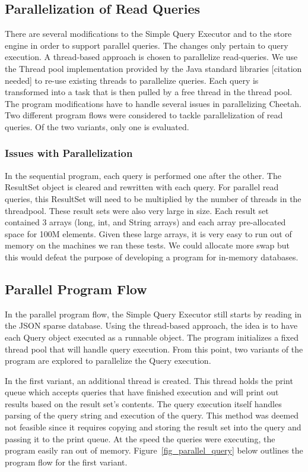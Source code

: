 \documentclass[11pt,journal,compsoc]{IEEEtran}
\begin{document}
\subsection{Parallelization of Read Queries}
There are several modifications to the Simple Query Executor and to the store engine in order to support parallel queries. The changes only pertain to query execution. A thread-based approach is chosen to parallelize read-queries. We use the Thread pool implementation provided by the Java standard libraries [citation needed] to re-use existing threads to parallelize queries. Each query is transformed into a task that is then pulled by a free thread in the thread pool. The program modifications have to handle several issues in parallelizing Cheetah. Two different program flows were considered to tackle parallelization of read queries. Of the two variants, only one is evaluated.

\subsubsection{Issues with Parallelization}
In the sequential program, each query is performed one after the other. The ResultSet object is cleared and rewritten with each query. For parallel read queries, this ResultSet will need to be multiplied by the number of threads in the threadpool. These result sets were also very large in size. Each result set contained 3 arrays (long, int, and String arrays) and each array pre-allocated space for 100M elements. Given these large arrays, it is very easy to run out of memory on the machines we ran these tests. We could allocate more swap but this would defeat the purpose of developing a program for in-memory databases.

\subsection{Parallel Program Flow}
In the parallel program flow, the Simple Query Executor still starts by reading in the JSON sparse database. Using the thread-based approach, the idea is to have each Query object executed as a runnable object. The program initializes a fixed thread pool that will handle query execution. From this point, two variants of the program are explored to parallelize the Query execution.


In the first variant, an additional thread is created. This thread holds the print queue which accepts queries that have finished execution and will print out results based on the result set’s contents. The query execution itself handles parsing of the query string and execution of the query. This method was deemed not feasible since it requires copying and storing the result set into the query and passing it to the print queue. At the speed the queries were executing, the program easily ran out of memory. Figure~\ref{fig_parallel_query} below outlines the program flow for the first variant.
\end{document}

